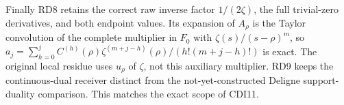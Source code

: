 Finally RD8 retains the correct raw inverse factor \(1/(2\zeta)\), the
full trivial-zero derivatives, and both endpoint values. Its expansion
of \(A_\rho\) is the Taylor convolution of the complete multiplier in
\(F_0\) with \(\zeta(s)/(s-\rho)^m\), so
\(a_j=\sum_{h=0}^j C^{(h)}(\rho)\zeta^{(m+j-h)}(\rho)/(h!(m+j-h)!)\) is
exact. The original local residue uses \(u_\rho\) of \(\zeta\), not this
auxiliary multiplier. RD9 keeps the continuous-dual receiver distinct
from the not-yet-constructed Deligne support-duality comparison. This
matches the exact scope of CDI11.
